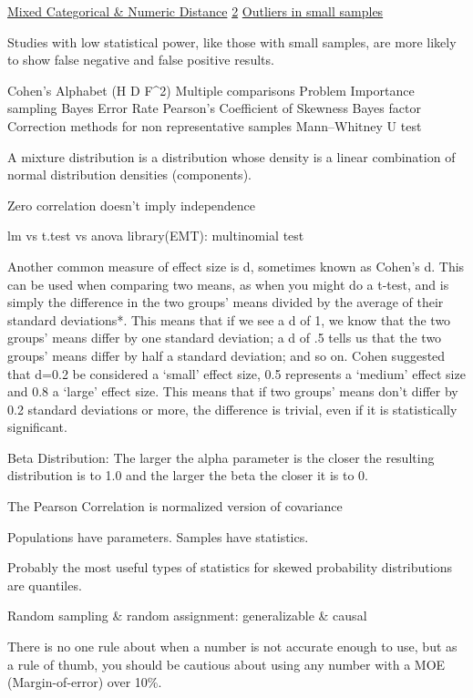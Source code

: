 \documentclass[]{book}
\begin{document}
\href{https://www.rdocumentation.org/packages/StatMatch/versions/1.2.5/topics/gower.dist}{Mixed Categorical \& Numeric Distance} \href{https://www.rdocumentation.org/packages/ltm/versions/1.1-1/topics/biserial.cor}{2} \href{https://stats.stackexchange.com/questions/78609/outlier-detection-in-very-small-sets/78617\#78617}{Outliers in small samples}

Studies with low statistical power, like those with small samples, are more likely to show false negative and false positive results.

Cohen's Alphabet (H D F\^{}2) Multiple comparisons Problem Importance sampling Bayes Error Rate Pearson's Coefficient of Skewness Bayes factor Correction methods for non representative samples Mann--Whitney U test

A mixture distribution is a distribution whose density is a linear combination of normal distribution densities (components).

Zero correlation doesn't imply independence

lm vs t.test vs anova library(EMT): multinomial test

Another common measure of effect size is d, sometimes known as Cohen's d. This can be used when comparing two means, as when you might do a t-test, and is simply the difference in the two groups' means divided by the average of their standard deviations*. This means that if we see a d of 1, we know that the two groups' means differ by one standard deviation; a d of .5 tells us that the two groups' means differ by half a standard deviation; and so on. Cohen suggested that d=0.2 be considered a `small' effect size, 0.5 represents a `medium' effect size and 0.8 a `large' effect size. This means that if two groups' means don't differ by 0.2 standard deviations or more, the difference is trivial, even if it is statistically significant.

Beta Distribution: The larger the alpha parameter is the closer the resulting distribution is to 1.0 and the larger the beta the closer it is to 0.

The Pearson Correlation is normalized version of covariance

Populations have parameters. Samples have statistics.

Probably the most useful types of statistics for skewed probability distributions are quantiles.

Random sampling \& random assignment: generalizable \& causal

There is no one rule about when a number is not accurate enough to use, but as a rule of thumb, you should be cautious about using any number with a MOE (Margin-of-error) over 10\%.
\end{document}
